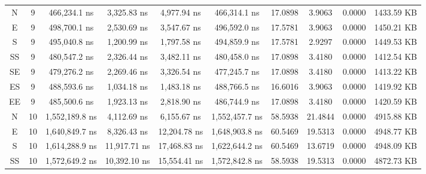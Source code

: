 \begin{sidewaystable}
\begin{tabular}{|c|c|c|c|c|c|c|c|c|c|}
        N       &   9       &   466,234.1 ns          &   3,325.83 ns       &   4,977.94 ns           &   466,314.1 ns          &   17.0898     &   3.9063      &   0.0000      &   1433.59 KB       \\
        E       &   9       &   498,700.1 ns          &   2,530.69 ns       &   3,547.67 ns           &   496,592.0 ns          &   17.5781     &   3.9063      &   0.0000      &   1450.21 KB       \\
        S       &   9       &   495,040.8 ns          &   1,200.99 ns       &   1,797.58 ns           &   494,859.9 ns          &   17.5781     &   2.9297      &   0.0000      &   1449.53 KB       \\
        SS      &   9       &   480,547.2 ns          &   2,326.44 ns       &   3,482.11 ns           &   480,458.0 ns          &   17.0898     &   3.4180      &   0.0000      &   1412.54 KB       \\
        SE      &   9       &   479,276.2 ns          &   2,269.46 ns       &   3,326.54 ns           &   477,245.7 ns          &   17.0898     &   3.4180      &   0.0000      &   1413.22 KB       \\
        ES      &   9       &   488,593.6 ns          &   1,034.18 ns       &   1,483.18 ns           &   488,766.5 ns          &   16.6016     &   3.9063      &   0.0000      &   1419.92 KB       \\
        EE      &   9       &   485,500.6 ns          &   1,923.13 ns       &   2,818.90 ns           &   486,744.9 ns          &   17.0898     &   3.4180      &   0.0000      &   1420.59 KB       \\
        N       &   10      &   1,552,189.8 ns        &   4,112.69 ns       &   6,155.67 ns           &   1,552,457.7 ns        &   58.5938     &   21.4844     &   0.0000      &   4915.88 KB       \\
        E       &   10      &   1,640,849.7 ns        &   8,326.43 ns       &   12,204.78 ns          &   1,648,903.8 ns        &   60.5469     &   19.5313     &   0.0000      &   4948.77 KB       \\
        S       &   10      &   1,614,288.9 ns        &   11,917.71 ns      &   17,468.83 ns          &   1,622,644.2 ns        &   60.5469     &   13.6719     &   0.0000      &   4948.09 KB       \\
        SS      &   10      &   1,572,649.2 ns        &   10,392.10 ns      &   15,554.41 ns          &   1,572,842.8 ns        &   58.5938     &   19.5313     &   0.0000      &   4872.73 KB       \\

\end{tabular}
\end{sidewaystable}
